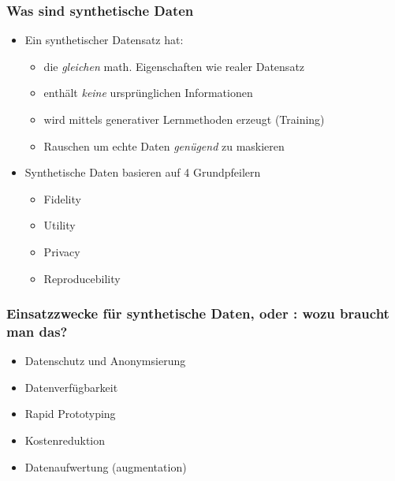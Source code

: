 \documentclass[
	11pt, %
]{beamer}
\begin{document}
\begin{frame}
    \frametitle{Was sind synthetische Daten}
    \begin{itemize}
        \item Ein synthetischer Datensatz hat: \parencite{mit_sloan_what_2023}
        \begin{itemize}
            \item die \textit{gleichen} math. Eigenschaften wie realer Datensatz
            \item enthält \textit{keine} ursprünglichen Informationen
            \item wird mittels generativer Lernmethoden erzeugt (Training)
            \item Rauschen um echte Daten \textit{genügend} zu maskieren
        \end{itemize}
    \end{itemize}
    \medskip
    \begin{itemize}        
        \item Synthetische Daten basieren auf 4 Grundpfeilern %
        \begin{itemize}
            \item Fidelity
            \item Utility
            \item Privacy
            \item Reproducebility
        \end{itemize}
    \end{itemize}
    
\end{frame}

\begin{frame}
    \frametitle{Einsatzzwecke für synthetische Daten, oder : wozu braucht man das?}
    \begin{itemize}
        \item Datenschutz und Anonymsierung
        \item Datenverfügbarkeit
        \item Rapid Prototyping 
        \item Kostenreduktion %
        \item Datenaufwertung (augmentation)    
    \end{itemize}
\end{frame}
\end{document}
